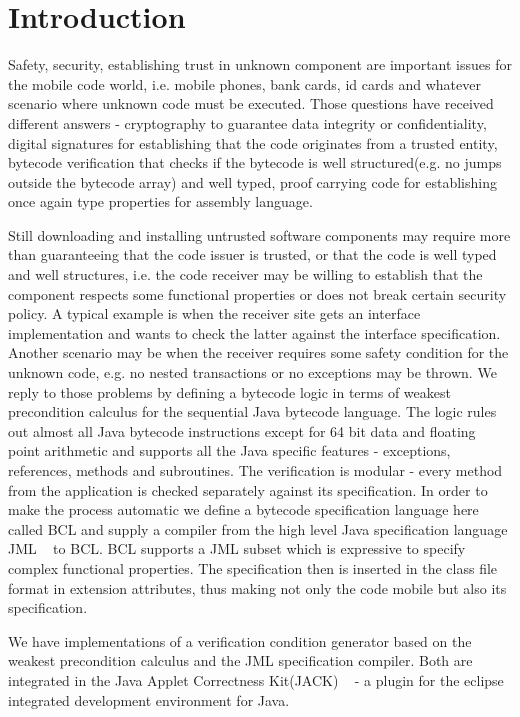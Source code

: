 
\section{Introduction}\label{intro}
Safety, security, establishing trust in unknown component are important issues for the mobile code world, i.e. mobile phones, bank cards, id cards and whatever scenario where 
unknown code must be executed. Those questions have received different answers - cryptography to guarantee data integrity or confidentiality,
 digital signatures for establishing that the code originates from a trusted entity, bytecode verification that checks if the bytecode is well structured(e.g. no jumps outside the bytecode array) and well typed, proof carrying code for establishing once again type properties for assembly language.  

Still downloading and installing untrusted software components may require more than guaranteeing that the code issuer is trusted, or that the code is well typed and well structures, i.e. the code receiver may be willing to establish that the component respects some functional properties or does not break certain security policy. 
A typical example is when the receiver site gets an interface implementation and wants to check the latter against the interface specification. Another scenario may be when the receiver requires some safety condition for the unknown code, e.g. no nested transactions or no exceptions may be thrown.  
We reply to those problems by defining a bytecode logic in terms of weakest precondition calculus for the sequential Java bytecode language. The logic rules out almost all Java bytecode instructions except for 64 bit data and floating point arithmetic and supports all the Java specific features - exceptions, references, methods and subroutines. The verification is modular  -  every method from the application is checked separately against its specification. In order to make the process automatic we define a bytecode specification language here called BCL and supply a compiler from the high level Java specification language JML ~\cite{JMLRefMan} to BCL. BCL supports a JML subset which is expressive to specify complex functional properties. The specification then is inserted in the class file format in extension attributes, thus making not only the code mobile but also its specification.

We have implementations of a verification condition generator based on the weakest precondition calculus and the JML specification compiler. Both are integrated in the Java Applet Correctness Kit(JACK) ~\cite{BRL-JACK} - a plugin for the eclipse integrated development environment for Java.

